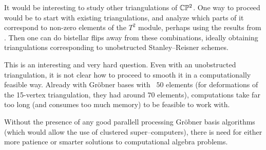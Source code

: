 It would be interesting to study other triangulations of $\mathbb{C} \mathbb{P}^2$. One way to proceed would be to start with existing triangulations, and analyze which parts of it correspond to non-zero elements of the $T^2$ module, perhaps using the results from \cite{deforming_christophersen}. Then one can do bistellar flips away from these combinations, ideally obtaining triangulations corresponding to unobstructed Stanley--Reisner schemes.

This is an interesting and very hard question. Even with an unobstructed triangulation, it is not clear how to proceed to smooth it in a computationally feasible way. Already with Gröbner bases with ~$50$ elements (for deformations of the 15-vertex triangulation, they had around $70$ elements), computations take far too long (and consumes too much memory) to be feasible to work with.

Without the presence of any good parallell processing Gröbner basis algorithms (which would allow the use of clustered super--computers), there is need for either more patience or smarter solutions to computational algebra problems.